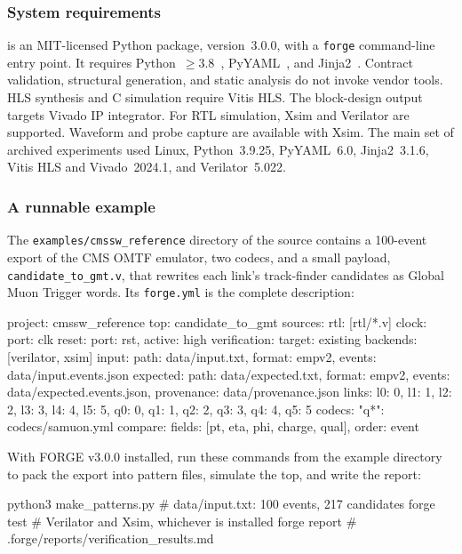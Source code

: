 \subsubsection{System requirements}

\forge{} is an MIT-licensed Python package, version~3.0.0, with a \texttt{forge} command-line entry point. It requires Python~$\geq3.8$~\cite{Python_Language}, PyYAML~\cite{PyYAML}, and Jinja2~\cite{Jinja2}. Contract validation, structural generation, and static analysis do not invoke vendor tools. HLS synthesis and C simulation require Vitis HLS. The block-design output targets Vivado IP integrator. For RTL simulation, Xsim and Verilator are supported. Waveform and probe capture are available with Xsim. The main set of archived experiments used Linux, Python~3.9.25, PyYAML~6.0, Jinja2~3.1.6, Vitis HLS and Vivado~2024.1, and Verilator~5.022.

\subsubsection{A runnable example}
\label{sec:methods:implementation:workflow}

The \texttt{examples/cmssw\_reference} directory of the source contains a 100-event export of the CMS OMTF emulator, two codecs, and a small payload, \texttt{candidate\_to\_gmt.v}, that rewrites each link's track-finder candidates as Global Muon Trigger words. Its \texttt{forge.yml} is the complete description:

\begin{codeblock}
project: cmssw_reference
top: candidate_to_gmt
sources:
  rtl: [rtl/*.v]
clock: {port: clk}
reset: {port: rst, active: high}
verification:
  target: existing
  backends: [verilator, xsim]
  input: {path: data/input.txt, format: empv2, events: data/input.events.json}
  expected: {path: data/expected.txt, format: empv2, events: data/expected.events.json,
             provenance: data/provenance.json}
  links: {l0: 0, l1: 1, l2: 2, l3: 3, l4: 4, l5: 5, q0: 0, q1: 1, q2: 2, q3: 3, q4: 4, q5: 5}
  codecs:
    "q*": codecs/samuon.yml
  compare: {fields: [pt, eta, phi, charge, qual], order: event}
\end{codeblock}

With FORGE v3.0.0 installed, run these commands from the example directory to pack the export into pattern files, simulate the top, and write the report:

\begin{codeblock}
python3 make_patterns.py   # data/input.txt: 100 events, 217 candidates
forge test                 # Verilator and Xsim, whichever is installed
forge report               # .forge/reports/verification_results.md
\end{codeblock}

